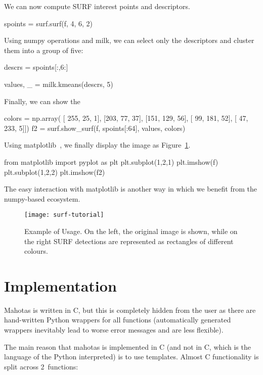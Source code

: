 \documentclass{article}
\newcommand*{\cpp}{{C\nolinebreak[4]\hspace{-.05em}\raisebox{.4ex}{\tiny\textbf{++}}}}
\begin{document}
We can now compute SURF interest points and descriptors.
\begin{python}
spoints = surf.surf(f, 4, 6, 2)
\end{python}

Using numpy operations and milk, we can select only the descriptors and cluster
them into a group of five:

\begin{python}
descrs = spoints[:,6:]

values, _ = milk.kmeans(descrs, 5)
\end{python}

Finally, we can show the 
\begin{python}
colors = np.array(
    [ 255,  25,   1],
    [203,  77,  37],
    [151, 129,  56],
    [ 99, 181,  52],
    [ 47, 233,   5]])
f2 = surf.show_surf(f, spoints[:64], values, colors)
\end{python}

Using matplotlib~\citep{10.1109/MCSE.2007.55}, we finally display the image as
Figure~\ref{fig:surf}.

\begin{python}
from matplotlib import pyplot as plt
plt.subplot(1,2,1)
plt.imshow(f)
plt.subplot(1,2,2)
plt.imshow(f2)
\end{python}

The easy interaction with matplotlib is another way in which we benefit from
the numpy-based ecosystem.

\begin{figure}
\begin{center}
\texttt{[image: surf-tutorial]}
\end{center}
\caption{Example of Usage. On the left, the original image is shown, while on
the right SURF detections are represented as rectangles of different colours.}
\label{fig:surf}
\end{figure}

\section{Implementation}

Mahotas is written in \cpp, but this is completely hidden from the user as
there are hand-written Python wrappers for all functions (automatically
generated wrappers inevitably lead to worse error messages and are less
flexible).

The main reason that mahotas is implemented in \cpp{} (and not in C, which is
the language of the Python interpreted) is to use templates. Almost \cpp{}
functionality is split across 2~functions:
\end{document}
